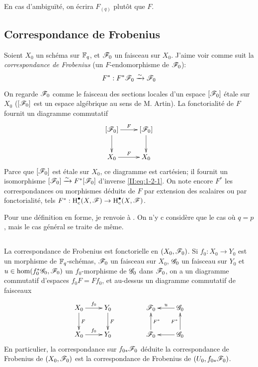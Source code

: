 En cas d'ambiguïté, on écrira $F_{(q)}$ plutôt que $F$. 










\subsection{Correspondance de Frobenius}\label{II:1-2}

Soient $X_0$ un schéma sur $\mathbb{F}_q$, et $\mathscr{F}_0$ un faisceau sur $X_0$. J'aime 
voir comme suit la \emph{correspondance de Frobenius} (un $F$-endomorphisme de 
$\mathscr{F}_0$): 
\begin{equation}\label{II:eq:1-2-1}
  F^* : F^*\mathscr{F}_0 \xrightarrow\sim \mathscr{F}_0
\end{equation}

On regarde $\mathscr{F}_0$ comme le faisceau des sections locales d'un espace 
$[\mathscr{F}_0]$ étale sur $X_0$ ($[\mathscr{F}_0]$ est un espace algébrique au sens de M. 
Artin). La fonctorialité de $F$ fournit un diagramme commutatif 
\[\xymatrix{
  [\cF_0] \ar[r]^-F \ar[d]
    & [\cF_0] \ar[d] \\
  X_0 \ar[r]^F 
    & X_0
}\]
Parce que $[\mathscr{F}_0]$ est étale sur $X_0$, ce diagramme est cartésien; il fournit 
un isomorphisme $[\mathscr{F}_0]\xrightarrow\sim F^*[\mathscr{F}_0]$ d'inverse \eqref{II:eq:1-2-1}. On note 
encore $F^*$ les correspondances ou morphismes déduits de $F$ par extension 
des scalaires ou par fonctorialité, tels 
$F^*:\operatorname{H}_c^\bullet(X,\mathscr{F})\to \operatorname{H}_c^\bullet(X,\mathscr{F})$. 

Pour une définition en forme, je renvoie à \cite[XI.1,2]{SGA5}. On n'y c
considère que le cas où $q=p$, mais le cas général se traite de même. 





\subsection{}\label{II:1-3}

La correspondance de Frobenius est fonctorielle en $(X_0,\mathscr{F}_0)$. Si 
$f_0:X_0\to Y_0$ est un morphisme de $\mathbb{F}_q$-schémas, $\mathscr{F}_0$ un faisceau sur 
$X_0$, $\mathscr{G}_0$ un faisceau sur $Y_0$ et $u\in\hom(f_0^*\mathscr{G}_0,\mathscr{F}_0)$ un 
$f_0$-morphisme de $\mathscr{G}_0$ dans $\mathscr{F}_0$, on a un diagramme commutatif d'espaces 
$f_0 F = F f_0$, et au-dessus un diagramme commutatif de faisceaux 
\[\xymatrix{
  X_0 \ar[r]^-{f_0} \ar[d]^-F
    & Y_0 \ar[d]^-F \\
  X_0 \ar[r]^-{f_0} 
    & Y_0
}\qquad\qquad
\xymatrix{
  \cF_0 
    & \ar[l]_-u \cG_0 \\
  \cF_0 \ar[u]_-{F^*} 
    & \ar[l] \cG_0 \ar[u]^-{F^*}
}\]
En particulier, la correspondance sur $f_{0*}\mathscr{F}_0$ déduite la correspondance 
de Frobenius de $(X_0,\mathscr{F}_0)$ est la correspondance de Frobenius de 
$(U_0,f_{0*}\mathscr{F}_0)$. 





